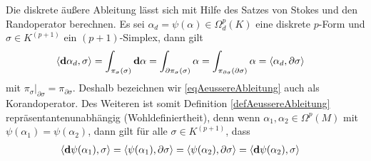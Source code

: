   \begin{folgerung}
    Die diskrete äußere Ableitung lässt sich mit Hilfe des Satzes von Stokes und den Randoperator berechnen.
    Es sei \( \alpha_{d}=\psi(\alpha)\in\Omega_{d}^{p}(K) \) eine diskrete \( p \)-Form und \( \sigma\in K^{(p+1)} \) ein \( (p+1) \)-Simplex, dann gilt
    \begin{align}
      \left\langle \mathbf{d}\alpha_{d} , \sigma \right\rangle &= \int_{\pi_{\sigma}(\sigma)} \mathbf{d}\alpha 
                                                          = \int_{\partial\pi_{\sigma}(\sigma)} \alpha
                                                          = \int_{\pi_{\partial\sigma}(\partial\sigma)} \alpha
                                                          = \left\langle \alpha_{d} , \partial\sigma \right\rangle
    \end{align}
    mit \( \pi_{\sigma}|_{\partial\sigma} = \pi_{\partial\sigma} \).
    Deshalb bezeichnen wir \eqref{eqAeussereAbleitung} auch als Korandoperator.
    Des Weiteren ist somit Definition \ref{defAeussereAbleitung} repräsentantenunabhängig (Wohldefiniertheit),
    denn wenn \( \alpha_{1},\alpha_{2} \in \Omega^{p}(M) \) mit \( \psi(\alpha_{1}) = \psi(\alpha_{2}) \), 
    dann gilt für alle \( \sigma\in K^{(p+1)} \), dass
    \begin{align}
      \left\langle \mathbf{d}\psi(\alpha_{1}), \sigma \right\rangle &= \left\langle \psi(\alpha_{1}), \partial\sigma \right\rangle
                                                               = \left\langle \psi(\alpha_{2}), \partial\sigma \right\rangle
                                                               = \left\langle \mathbf{d}\psi(\alpha_{2}), \sigma \right\rangle
    \end{align}
  \end{folgerung}
  
